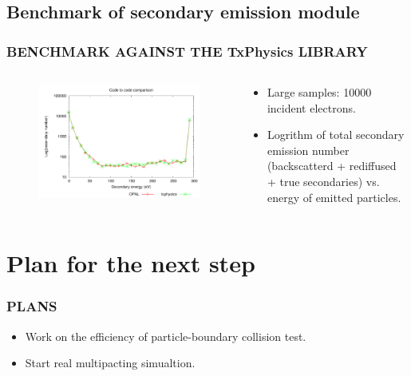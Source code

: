 \documentclass{beamer}
\begin{document}
\subsection{Benchmark of secondary emission module}
\begin{frame}
\frametitle{BENCHMARK AGAINST THE TxPhysics LIBRARY}
\begin{columns}
\begin{column}[t]{5.cm}
\begin{figure}[H]
\begin{center}
\includegraphics[width=1.2\textwidth]{code_comparison.pdf}
\end{center}
\end{figure}
\pause
\end{column}
\begin{column}[t]{5cm}
\begin{itemize}
\item Large samples: 10000 incident electrons.
\pause
\item Logrithm of total secondary emission number (backscatterd + rediffused + true secondaries) vs. energy of emitted particles.
\end{itemize}
\end{column}
\end{columns}


\end{frame} %
\section{Plan for the next step}
\begin{frame}
\frametitle{PLANS}
\begin{itemize}
\item Work on the efficiency of particle-boundary collision test.
\pause
\item Start real multipacting simualtion.
\end{itemize}
\end{frame}
\end{document}
